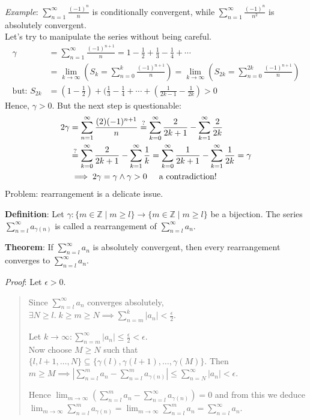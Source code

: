 \documentclass[11pt]{article}
\newcommand{\qeq}{\stackrel{?}{=}}
\begin{document}
\emph{Example}: $\sum_{n=1}^\infty \frac{(-1)^n}{n}$ is conditionally convergent, while $\sum_{n=1}^\infty \frac{(-1)^n}{n^2}$ is absolutely convergent.\\

Let's try to manipulate the series without being careful.
\begin{align*}
\gamma &= \sum_{n=1}^\infty \frac{(-1)^{n+1}}{n} = 1 - \frac{1}{2} + \frac{1}{3} - \frac{1}{4} + \cdots\\
&= \lim_{k \to \infty} (S_k = \sum_{n=0}^k \frac{(-1)^{n+1}}{n}) = \lim_{k \to \infty} (S_{2k} = \sum_{n=0}^{2k} \frac{(-1)^{n+1}}{n})\\
\text{but: } S_{2k} &= (1-\frac{1}{2}) + (\frac{1}{3} - \frac{1}{4} + \cdots + (\frac{1}{2k-1} - \frac{1}{2k}) > 0
\end{align*}
Hence, $\gamma > 0$. But the next step is questionable:
\begin{align*}
2\gamma &= \sum_{n=1}^\infty \frac{(2)(-1)^{n+1}}{n} \qeq \sum_{k=0}^\infty \frac{2}{2k+1} - \sum_{k=1}^\infty \frac{2}{2k}\\
&\qeq \sum_{k=0}^\infty \frac{2}{2k+1} - \sum_{k=1}^\infty \frac{1}{k} = \sum_{k=0}^\infty \frac{1}{2k+1} - \sum_{k=1}^\infty \frac{1}{2k} = \gamma\\
&\implies 2\gamma = \gamma \land \gamma > 0 \hspace{0.5cm} \text{a contradiction!}
\end{align*}
Problem: rearrangement is a delicate issue.

\textbf{Definition}: Let $\gamma : \{m \in \mathbb{Z} \mid m \geq l\} \to \{m \in \mathbb{Z} \mid m \geq l\}$ be a bijection. The series $\sum_{n=l}^\infty a_{\gamma(n)}$ is called a rearrangement of $\sum_{n=l}^\infty a_n$.

\textbf{Theorem}: If $\sum_{n=l}^\infty a_n$ is absolutely convergent, then every rearrangement converges to $\sum_{n=l}^\infty a_n$.

\emph{Proof}: Let $\epsilon > 0$.
\begin{quote}
Since $\sum_{n=l}^\infty a_n$ converges absolutely, $\exists N \geq l.\; k \geq m \geq N \implies \sum_{n=m}^k |a_n| < \frac{\epsilon}{2}$.

Let $k \to \infty : \sum_{n=m}^\infty |a_n| \leq \frac{\epsilon}{2} < \epsilon$.\\
Now choose $M \geq N$ such that $\{l, l+1, \ldots, N\} \subseteq \{\gamma(l), \gamma(l+1), \ldots, \gamma(M)\}$. Then $m \geq M \implies |\sum_{n=l}^m a_n - \sum_{n=l}^m a_{\gamma(n)}| \leq \sum_{n=N}^\infty |a_n| < \epsilon$.

Hence $\lim_{m \to \infty} (\sum_{n=l}^m a_n - \sum_{n=l}^\infty a_{\gamma(n)}) = 0$ and from this we deduce\\
$\lim_{m \to \infty} \sum_{n=l}^m a_{\gamma(n)} = \lim_{m \to \infty} \sum_{n=l}^m a_n = \sum_{n=l}^\infty a_n$.
\end{quote}
\end{document}
